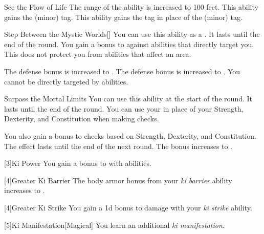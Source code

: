 {\begin{apability}{See the Flow of Life}
                \rankline
                 The range of the ability is increased to 100 feet.
                 This ability gains the  (minor) tag.
                 This ability gains the  tag in place of the  (minor) tag.
            \end{apability}

            \begin{apability}{Step Between the Mystic Worlds}[]
                You can use this ability as a .
                It lasts until the end of the round.
                You gain a  bonus to  against  abilities that directly target you.
                This does not protect you from abilities that affect an area.

                \rankline
                 The defense bonus is increased to .
                 The defense bonus is increased to .
                 You cannot be directly targeted by  abilities.
            \end{apability}

            \begin{apability}{Surpass the Mortal Limits}
                You can use this ability at the start of the round.
                It lasts until the end of the round.
                You can use your  in place of your Strength, Dexterity, and Constitution when making checks.

                \rankline
                 You also gain a  bonus to checks based on Strength, Dexterity, and Constitution.
                 The effect lasts until the end of the next round.
                 The bonus increases to .
            \end{apability}

        }

        [3]{Ki Power} You gain a  bonus to  with  abilities.

        [4]{Greater Ki Barrier} The body armor bonus from your \textit{ki barrier} ability increases to .

        [4]{Greater Ki Strike} You gain a \plus1d bonus to damage with your \textit{ki strike} ability.

        [5]{Ki Manifestation}[Magical]
        You learn an additional \textit{ki manifestation}.

